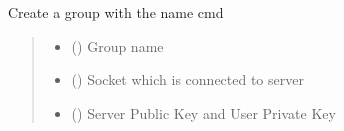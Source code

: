 \documentclass[letterpaper,10pt,english]{sphinxmanual}
\begin{document}
\begin{fulllineitems}
\label{\detokenize{userInputHandler:userInputHandler.createGroup}}
\pysigstartsignatures
{}
\pysigstopsignatures
\sphinxAtStartPar
Create a group with the name cmd
\begin{quote}\begin{description}
\begin{itemize}
\item {} 
\sphinxAtStartPar
{} () \textendash{} Group name

\item {} 
\sphinxAtStartPar
{} () \textendash{} Socket which is connected to server

\item {} 
\sphinxAtStartPar
{} () \textendash{} Server Public Key and User Private Key

\end{itemize}

\end{description}\end{quote}

\end{fulllineitems}

\end{document}
